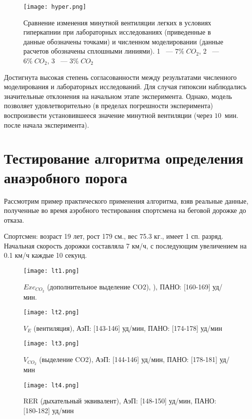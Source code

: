 \begin{figure}[!ht]
	\centering
	\texttt{[image: hyper.png]}
	\caption{Сравнение изменения минутной вентиляции легких в условиях гиперкапнии при лабораторных исследованиях (приведенные в \cite{reynolds1972} данные обозначены точками) и численном моделировании (данные расчетов обозначены сплошными линиями). 1 ~--- \(7\% \;CO_{2}\), 2 ~--- \(6\% \;CO_{2}\), 3 ~--- \(3\% \;CO_{2}\) } 
\end{figure}

Достигнута высокая степень согласованности между результатами численного моделирования и лабораторных исследований. Для случая гипоксии наблюдались значительные отклонения на начальном этапе эксперимента. Однако, модель позволяет удовлетворительно (в пределах погрешности эксперимента) воспроизвести установившееся значение минутной вентиляции (через $10$~мин. после начала эксперимента).

\section{Тестирование алгоритма определения анаэробного порога}
Рассмотрим пример практического применения алгоритма, взяв реальные данные, полученные во время аэробного тестирования спортсмена на беговой дорожке до отказа. 

Спортсмен: возраст 19 лет, рост 179 см., вес 75.3 кг., имеет 1 сп. разряд. Начальная скорость дорожки составляла 7 км/ч, с последующим увеличением на 0.1 км/ч каждые 10 секунд.

\begin{figure}[!ht]
	\centering
	\texttt{[image: lt1.png]}
	\caption{\(Exc_{CO_{2}}\) (дополнительное выделение CO2), ), ПАНО: [160-169] уд/мин.} 
\end{figure}

\begin{figure}[!ht]
	\centering
	\texttt{[image: lt2.png]}
	\caption{\(V_{E}\) (вентиляция), АэП: [143-146] уд/мин, ПАНО: [174-178] уд/мин} 
\end{figure}

\begin{figure}[!ht]
	\centering
	\texttt{[image: lt3.png]}
	\caption{\(V_{CO_{2}}\) (выделение CO2), АэП: [144-146] уд/мин, 
ПАНО: [178-181] уд/мин } 
\end{figure}

\begin{figure}[!ht]
	\centering
	\texttt{[image: lt4.png]}
	\caption{RER (дыхательный эквивалент), АэП: [148-150] уд/мин, 
ПАНО: [180-182] уд/мин} 
\end{figure}

